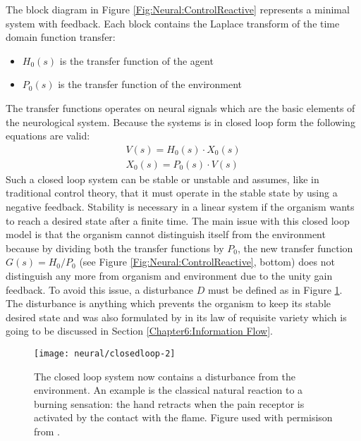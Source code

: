 The block diagram in Figure \ref{Fig:Neural:ControlReactive} represents a minimal system with feedback.
Each block contains the Laplace transform of the time domain function transfer:
\begin{itemize}
 \item $H_0(s)$ is the transfer function of the agent
 \item $P_0(s)$ is the transfer function of the environment
\end{itemize}
The transfer functions operates on neural signals which are the basic elements
 of the neurological system.
Because the systems is in closed loop form the following equations are valid:
\begin{eqnarray*}
  V(s)= H_0(s) \cdot X_0(s)\\
  X_0(s)=P_0(s) \cdot V(s) 
\end{eqnarray*}
Such a closed loop system can be stable or unstable and \citep{VonFoerster85} assumes,
like in traditional control theory, that it must operate in the stable state by 
using a negative feedback.
Stability is necessary in a linear system if the organism wants to reach a desired
 state after a finite time.
The main issue with this closed loop model is that the organism cannot distinguish
 itself from the environment because by dividing both the transfer functions by $P_0$,
the new transfer function $G(s)=H_0/P_0$ (see Figure \ref{Fig:Neural:ControlReactive}, bottom) 
does not distinguish any more from organism and environment due to the unity gain feedback. 
To avoid this issue, a disturbance $D$ must be defined as in Figure \ref{Fig:Neural:ReactiveDisturbance}.
The disturbance is anything which prevents the organism to keep its stable desired state 
and was also formulated by \citep{Ashby1956:IntroCybernetics} in its law of requisite variety which is going to
 be discussed in Section \ref{Chapter6:Information Flow}.

\begin{figure}[htbp]
\begin{center}
\texttt{[image: neural/closedloop-2]}
\end{center}
\small{
\caption[Closed loop reactive system with disturbance]{
The closed loop system now contains a disturbance from the environment.
An example is the classical natural reaction to a burning sensation:
 the hand retracts when the pain receptor is activated by the contact
with the flame. Figure used with permisison from \citet{Porr2006cf}.
\label{Fig:Neural:ReactiveDisturbance}}}
\end{figure}

